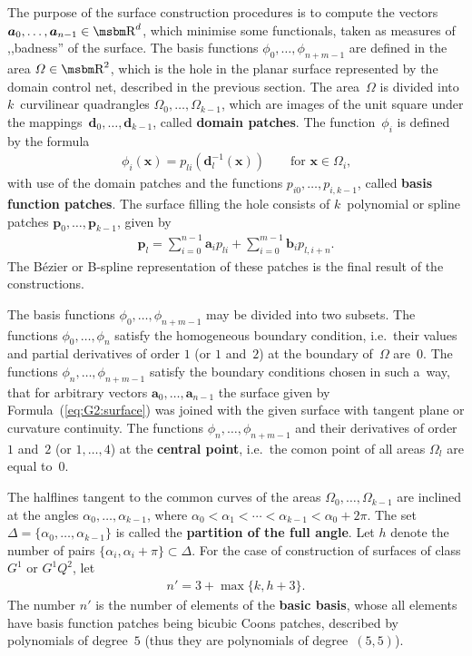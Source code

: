 \begin{sloppypar}
The purpose of the surface construction procedures is to compute the vectors
$\bm{a}_0,\ldots,\bm{a}_{n-1}\in\R^d$, which minimise some functionals,
taken as measures of ,,badness'' of the surface.
The basis functions $\phi_0,\ldots,\phi_{n+m-1}$ are defined in the area
$\varOmega\in\R^2$, which is the hole in the planar surface
represented by the domain control net, described in the previous section.
The area~$\varOmega$ is divided into $k$~curvilinear quadrangles
$\varOmega_0,\ldots,\varOmega_{k-1}$, which are images of the unit square
under the mappings~$\bm{d}_0,\ldots,\bm{d}_{k-1}$, called
\textbf{domain patches}. The function~$\phi_i$ is defined by the formula
\begin{align*}
  \phi_i(\bm{x}) = p_{li}(\bm{d}_l^{-1}(\bm{x}))\qquad
  \mbox{for $\bm{x}\in\varOmega_i$,}
\end{align*}
with use of the domain patches and the functions
$p_{i0},\ldots,p_{i,k-1}$, called \textbf{basis function patches}. The
surface filling the hole consists of $k$~polynomial or spline patches
$\bm{p}_0,\ldots,\bm{p}_{k-1}$, given by
\begin{align*}
  \bm{p}_l =
  \sum_{i=0}^{n-1}\bm{a}_ip_{li}+\sum_{i=0}^{m-1}\bm{b}_ip_{l,i+n}.
\end{align*}
The B\'{e}zier or B-spline representation of these patches is the final
result of the constructions.%
\end{sloppypar}

The basis functions $\phi_0,\ldots,\phi_{n+m-1}$ may be divided into two
subsets. The functions $\phi_0,\ldots,\phi_n$ satisfy the homogeneous
boundary condition, i.e.\ their values and partial derivatives of order $1$
(or $1$ and~$2$) at the boundary of~$\varOmega$ are~$0$. The functions
$\phi_n,\ldots,\phi_{n+m-1}$ satisfy the boundary conditions chosen in such
a~way, that for arbitrary vectors $\bm{a}_0,\ldots,\bm{a}_{n-1}$ the surface
given by Formula~(\ref{eq:G2:surface}) was joined with the given surface
with tangent plane or curvature continuity. The functions
$\phi_n,\ldots,\phi_{n+m-1}$ and
their derivatives of order $1$ and~$2$ (or $1,\ldots,4$) at the
\textbf{central point}, i.e.\
the comon point of all areas $\varOmega_l$ are equal to~$0$.

The halflines tangent to the common curves of the areas
$\varOmega_0,\ldots,\varOmega_{k-1}$ are inclined at the angles
$\alpha_0,\ldots,\alpha_{k-1}$, where
$\alpha_0<\alpha_1<\cdots<\alpha_{k-1}<\alpha_0+2\pi$. The set
$\varDelta=\{\alpha_0,\ldots,\alpha_{k-1}\}$ is called the \textbf{partition
of the full angle}. Let $h$ denote the number of pairs
$\{\alpha_i,\alpha_i+\pi\}\subset\varDelta$. For the case of construction
of surfaces of class $G^1$ or $G^1Q^2$, let
\begin{align*}
  n' = 3+\max\{k,h+3\}.
\end{align*}
The number $n'$ is the number of elements of the \textbf{basic basis},
whose all elements have basis function patches being bicubic Coons patches,
described by polynomials of degree~$5$ (thus they are polynomials of
degree~$(5,5)$).

